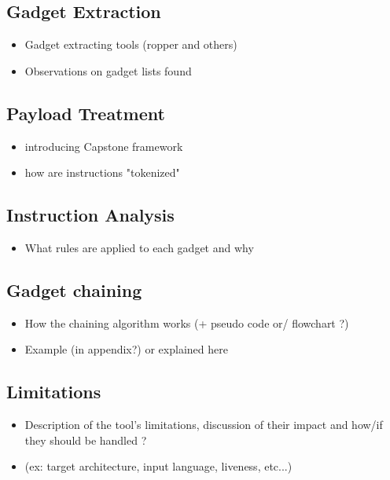 \documentclass[10pt,twocolumn]{article}
\begin{document}
\subsection{Gadget Extraction}
\begin{itemize}
    \item Gadget extracting tools (ropper and others)
    \item Observations on gadget lists found
\end{itemize}

\subsection{Payload Treatment}
\begin{itemize}
    \item introducing Capstone framework
    \item how are instructions "tokenized"
\end{itemize}
\subsection{Instruction Analysis}
\begin{itemize}
    \item What rules are applied to each gadget and why
\end{itemize}
\subsection{Gadget chaining}
\begin{itemize}
    \item How the chaining algorithm works (+ pseudo code or/ flowchart ?)
    \item Example (in appendix?) or explained here
\end{itemize}
\subsection{Limitations}
\begin{itemize}
    \item Description of the tool's limitations, discussion of their impact and
        how/if they should be handled ?
    \item (ex: target architecture, input language, liveness, etc...)
\end{itemize}



  
\end{document}
